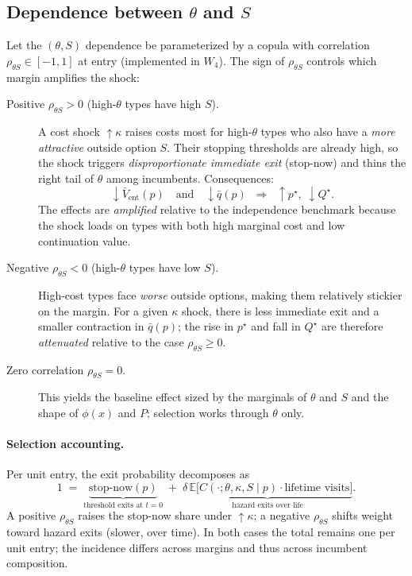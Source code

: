 \documentclass[11pt]{article}
\begin{document}
\subsection{Dependence between $\theta$ and $S$}
\label{sec:thetaS}

Let the $(\theta,S)$ dependence be parameterized by a copula with correlation $\rho_{\theta S}\in[-1,1]$ at entry (implemented in $W_4$). The sign of $\rho_{\theta S}$ controls which margin amplifies the shock:

\begin{description}
\item[Positive $\rho_{\theta S}>0$ (high-$\theta$ types have high $S$).]
A cost shock $\uparrow\kappa$ raises costs most for high-$\theta$ types who also have a \emph{more attractive} outside option $S$. Their stopping thresholds are already high, so the shock triggers \emph{disproportionate immediate exit} (stop-now) and thins the right tail of $\theta$ among incumbents. Consequences:
\[
\downarrow \bar V_{\text{ent}}(p) \quad \text{and} \quad \downarrow \bar q(p) \;\;\Longrightarrow\;\; \uparrow p^\star,\; \downarrow Q^\star.
\]
The effects are \emph{amplified} relative to the independence benchmark because the shock loads on types with both high marginal cost and low continuation value.

\item[Negative $\rho_{\theta S}<0$ (high-$\theta$ types have low $S$).]
High-cost types face \emph{worse} outside options, making them relatively stickier on the margin. For a given $\kappa$ shock, there is less immediate exit and a smaller contraction in $\bar q(p)$; the rise in $p^\star$ and fall in $Q^\star$ are therefore \emph{attenuated} relative to the case $\rho_{\theta S}\ge 0$.

\item[Zero correlation $\rho_{\theta S}=0$.]
This yields the baseline effect sized by the marginals of $\theta$ and $S$ and the shape of $\phi(x)$ and $P$; selection works through $\theta$ only.
\end{description}

\paragraph{Selection accounting.}
Per unit entry, the exit probability decomposes as
\[
1 \;=\; \underbrace{\text{stop-now}(p)}_{\text{threshold exits at }t=0}
\;+\; \underbrace{\delta\,\mathbb{E}\big[ C(\cdot;\theta,\kappa,S\mid p)\cdot \text{lifetime visits}\big]}_{\text{hazard exits over life}}.
\]
A positive $\rho_{\theta S}$ raises the stop-now share under $\uparrow\kappa$; a negative $\rho_{\theta S}$ shifts weight toward hazard exits (slower, over time). In both cases the total remains one per unit entry; the incidence differs across margins and thus across incumbent composition.
\end{document}
